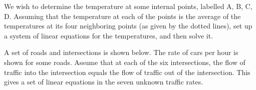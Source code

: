 \begin{center}

\end{center}

We wish to determine the temperature at some internal points, labelled A, B, C, D.  Assuming that the temperature at each
of the points is the average of the temperatures at its four neighboring points (as given by the
dotted lines), set up a system of linear equations for the temperatures, and then solve it.  





\edXsolution{
}

\endedxproblem





% 










\endedxvertical




A set of roads and intersections is shown below.  The rate of cars per hour is shown for some roads.  
Assume that at each of the six intersections, 
the flow of traffic into the intersection equals the flow of traffic
out of the intersection.  This gives a set of linear equations in the seven unknown traffic rates.  


